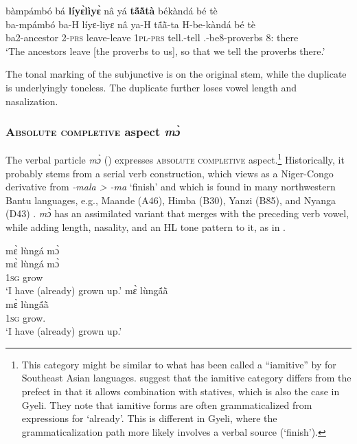\ea\label{HAB2}
  \glll bàmpámbó bá {\bfseries líyɛ̀lìyɛ̀} nâ yá {\bfseries tã́ã̀tà} békàndá bé tè \\
       ba-mpámbó ba-H líyɛ-liyɛ nâ ya-H tã́ã̀-ta H-be-kàndá bé tè \\
         ba2-ancestor 2-\textsc{prs} leave-leave {\COMP} 1\textsc{pl}-\textsc{prs} tell.{\SBJV}-tell {\OBJ}.{\LINK}-be8-proverbs 8:{\ATT} there\\
    \trans `The ancestors leave [the proverbs to us], so that we tell the proverbs there.'
\z

\noindent The tonal marking of the subjunctive is on the original stem, while the duplicate is underlyingly toneless. The duplicate further loses vowel length and nasalization.









\subsubsection{\textsc{Absolute completive} aspect {\itshape mɔ̀}}
\label{sec:COMPL}

The verbal particle {\itshape mɔ̀} () expresses \textsc{absolute completive} aspect.\footnote{This category might be similar to what has been called a ``iamitive'' by \citet{olsson2013} for Southeast Asian languages. \citet{dahl2016} suggest that the iamitive category differs from the prefect in that it allows combination with statives, which is also the case in Gyeli. They note that iamitive forms are often grammaticalized from expressions for `already'. This is different in Gyeli, where the grammaticalization path more likely involves a verbal source (`finish').} Historically, it probably stems from a serial verb construction, which \citet[67]{nurse08} views as a Niger-Congo derivative from {\itshape -mala > -ma} `finish' and which is found in many northwestern Bantu languages, e.g., Maande (A46), Himba (B30), Yanzi (B85), and Nyanga (D43) \citep[100]{nurse08}. {\itshape mɔ̀} has an assimilated variant that merges with the preceding verb vowel, while adding length, nasality, and an HL tone pattern to it, as in .

\ea\label{mo1}
\ea\label{mo1a}
  \glll    mɛ̀ lùngá mɔ̀ \\
           mɛ̀ lùngá mɔ̀  \\
             1\textsc{sg}  grow {\COMPL}  \\
    \trans `I have (already) grown up.'
\ex\label{mo1b}
  \glll    mɛ̀ lùngã́ã̀ \\
          mɛ̀ lùngã́ã̀ \\
             1\textsc{sg} grow.{\COMPL}    \\
    \trans `I have (already) grown up.'
\z
\z

